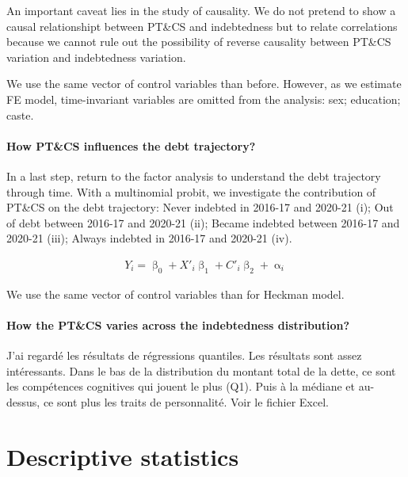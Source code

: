 \documentclass[a4paper, 11pt, onecolumn]{article}
\begin{document}
An important caveat lies in the study of causality.
We do not pretend to show a causal relationshipt between PT\&CS and indebtedness but to relate correlations because we cannot rule out the possibility of reverse causality between PT\&CS variation and indebtedness variation.

We use the same vector of control variables than before.
However, as we estimate FE model, time-invariant variables are omitted from the analysis: sex; education; caste. 

\paragraph{How PT\&CS influences the debt trajectory?}
In a last step, return to the factor analysis to understand the debt trajectory through time.
With a multinomial probit, we investigate the contribution of PT\&CS on the debt trajectory: Never indebted in 2016-17 and 2020-21 (i); Out of debt between 2016-17 and 2020-21 (ii); Became indebted between 2016-17 and 2020-21 (iii); Always indebted in 2016-17 and 2020-21 (iv).

\begin{equation}\label{eq:mprobit}
\begin{split}
Y_{i}=\upbeta_{0}+X'_{i}\upbeta_{1}+C'_{i}\upbeta_{2}+\upalpha_{i}
\end{split}
\end{equation}

We use the same vector of control variables than for Heckman model.

\paragraph{How the PT\&CS varies across the indebtedness distribution?}
J'ai regardé les résultats de régressions quantiles.
Les résultats sont assez intéressants.
Dans le bas de la distribution du montant total de la dette, ce sont les compétences cognitives qui jouent le plus (Q1).
Puis à la médiane et au-dessus, ce sont plus les traits de personnalité. 
Voir le fichier Excel.



\newpage
\section{Descriptive statistics}
\end{document}
